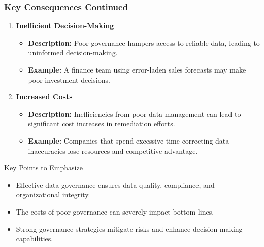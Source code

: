 \documentclass[aspectratio=169]{beamer}
\begin{document}
\begin{frame}[fragile]
    \frametitle{Key Consequences Continued}
    \begin{enumerate}[resume]
        \item \textbf{Inefficient Decision-Making}
            \begin{itemize}
                \item \textbf{Description:} Poor governance hampers access to reliable data, leading to uninformed decision-making.
                \item \textbf{Example:} A finance team using error-laden sales forecasts may make poor investment decisions.
            \end{itemize}
        
        \item \textbf{Increased Costs}
            \begin{itemize}
                \item \textbf{Description:} Inefficiencies from poor data management can lead to significant cost increases in remediation efforts.
                \item \textbf{Example:} Companies that spend excessive time correcting data inaccuracies lose resources and competitive advantage.
            \end{itemize}
    \end{enumerate}
    
    \pause
    \begin{block}{Key Points to Emphasize}
        \begin{itemize}
            \item Effective data governance ensures data quality, compliance, and organizational integrity.
            \item The costs of poor governance can severely impact bottom lines.
            \item Strong governance strategies mitigate risks and enhance decision-making capabilities.
        \end{itemize}
    \end{block}
\end{frame}
\end{document}
